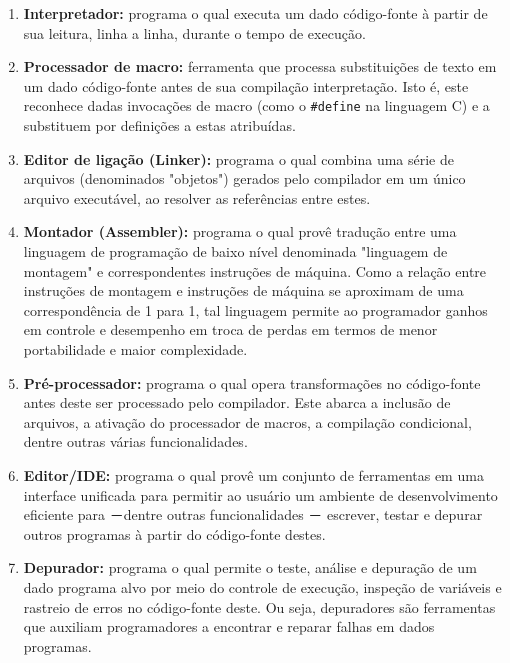   {
	\begin{enumerate}
		\item \textbf{Interpretador:} programa o qual executa um dado
		    código-fonte à partir de sua leitura, linha a linha, durante o
		    tempo de execução.
		\item \textbf{Processador de macro:} ferramenta que processa
		    substituições de texto em um dado código-fonte antes de sua
		    compilação interpretação. Isto é, este reconhece dadas invocações de
		    macro (como o \texttt{#define} na linguagem C) e a substituem por
		    definições a estas atribuídas.
		\item \textbf{Editor de ligação (Linker):} programa o qual combina uma
		    série de arquivos (denominados "objetos") gerados pelo compilador em
		    um único arquivo executável, ao resolver as referências entre estes.
		\item \textbf{Montador (Assembler):} programa o qual provê tradução
		    entre uma linguagem de programação de baixo nível denominada
		    "linguagem de montagem" e correspondentes instruções de máquina.
		    Como a relação entre instruções de montagem e instruções de máquina
		    se aproximam de uma correspondência de 1 para 1, tal linguagem
		    permite ao programador ganhos em controle e desempenho em troca de
		    perdas em termos de menor portabilidade e maior complexidade.
		\item \textbf{Pré-processador:} programa o qual opera transformações no
		    código-fonte antes deste ser processado pelo compilador. Este
		    abarca a inclusão de arquivos, a ativação do processador de macros,
		    a compilação condicional, dentre outras várias funcionalidades.
		\item \textbf{Editor/IDE:} programa o qual provê um conjunto de
		    ferramentas em uma interface unificada para permitir ao usuário um
		    ambiente de desenvolvimento eficiente para －dentre outras
		    funcionalidades － escrever, testar e depurar outros programas à
		    partir do código-fonte destes.
		\item \textbf{Depurador:} programa o qual permite o teste, análise e
		    depuração de um dado programa alvo por meio do controle de execução,
		    inspeção de variáveis e rastreio de erros no código-fonte deste.
		    Ou seja, depuradores são ferramentas que  auxiliam programadores
		    a encontrar e reparar falhas em dados programas.
	\end{enumerate}
}

